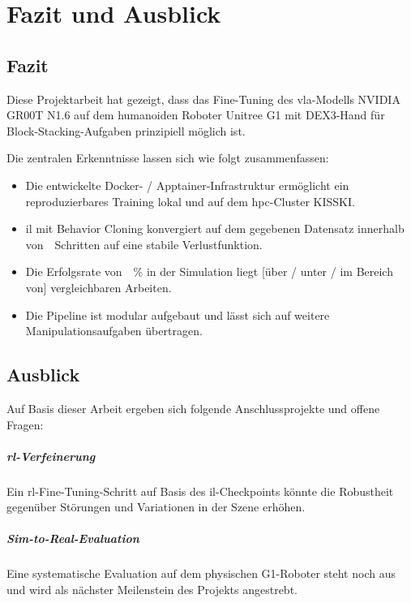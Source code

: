 
\chapter{Fazit und Ausblick}
\label{chap:fazit}

\section{Fazit}
\label{sec:fazit}

Diese Projektarbeit hat gezeigt, dass das Fine-Tuning des \ac{vla}-Modells
NVIDIA GR00T N1.6 auf dem humanoiden Roboter Unitree G1 mit DEX3-Hand für
Block-Stacking-Aufgaben prinzipiell möglich ist.

Die zentralen Erkenntnisse lassen sich wie folgt zusammenfassen:

\begin{itemize}
  \item Die entwickelte Docker- / Apptainer-Infrastruktur ermöglicht ein
    reproduzierbares Training lokal und auf dem \ac{hpc}-Cluster KISSKI.
  \item \ac{il} mit Behavior Cloning konvergiert auf dem gegebenen Datensatz
    innerhalb von~~Schritten auf eine stabile Verlustfunktion.
  \item Die Erfolgsrate von~\TODO[Erfolgsrate in \%]~\unit{\percent} in der Simulation liegt
    [über / unter / im Bereich von] vergleichbaren Arbeiten.
  \item Die Pipeline ist modular aufgebaut und lässt sich auf weitere
    Manipulationsaufgaben übertragen.
\end{itemize}

\section{Ausblick}
\label{sec:ausblick}

Auf Basis dieser Arbeit ergeben sich folgende Anschlussprojekte und
offene Fragen:

\paragraph{\ac{rl}-Verfeinerung}
Ein \ac{rl}-Fine-Tuning-Schritt auf Basis des \ac{il}-Checkpoints könnte die
Robustheit gegenüber Störungen und Variationen in der Szene erhöhen.

\paragraph{Sim-to-Real-Evaluation}
Eine systematische Evaluation auf dem physischen G1-Roboter steht noch aus
und wird als nächster Meilenstein des Projekts angestrebt.

